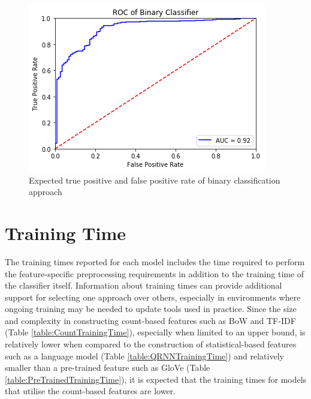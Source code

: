 \documentclass[a4paper,twoside,phd]{BYUPhys}
\begin{document}
\begin{figure}[H]
	\centering
	\includegraphics[totalheight=6cm]{images/binary-roc-curve.png}
	\caption{Expected true positive and false positive rate of binary classification approach}
	\label{fig:BinaryPerformance}
\end{figure}



\section{Training Time}
\label{sec:TrainingTime}

The training times reported for each model includes the time required to perform the feature-specific preprocessing requirements in addition to the training time of the classifier itself. Information about training times can provide additional support for selecting one approach over others, especially in environments where ongoing training may be needed to update tools used in practice. Since the size and complexity in constructing count-based features such as BoW and TF-IDF (Table \ref{table:CountTrainingTime}), especially when limited to an upper bound, is relatively lower when compared to the construction of statistical-based features such as a language model (Table \ref{table:QRNNTrainingTime}) and relatively smaller than a pre-trained feature such as GloVe (Table \ref{table:PreTrainedTrainingTime}), it is expected that the training times for models that utilise the count-based features are lower.
\end{document}
